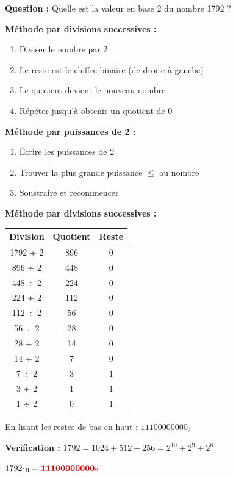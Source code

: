 \documentclass[12pt,a4paper]{article}
\begin{document}
\begin{exercice}
\textbf{Question :} Quelle est la valeur en base 2 du nombre 1792 ?
\end{exercice}

\begin{methode}
\textbf{Méthode par divisions successives :}

\begin{enumerate}
    \item Diviser le nombre par 2
    \item Le reste est le chiffre binaire (de droite à gauche)
    \item Le quotient devient le nouveau nombre
    \item Répéter jusqu'à obtenir un quotient de 0
\end{enumerate}

\textbf{Méthode par puissances de 2 :}
\begin{enumerate}
    \item Écrire les puissances de 2
    \item Trouver la plus grande puissance $\leq$ au nombre
    \item Soustraire et recommencer
\end{enumerate}
\end{methode}

\begin{solution}
\textbf{Méthode par divisions successives :}

\begin{center}
\begin{tabular}{|c|c|c|}
\hline
\textbf{Division} & \textbf{Quotient} & \textbf{Reste} \\
\hline
1792 ÷ 2 & 896 & 0 \\
896 ÷ 2 & 448 & 0 \\
448 ÷ 2 & 224 & 0 \\
224 ÷ 2 & 112 & 0 \\
112 ÷ 2 & 56 & 0 \\
56 ÷ 2 & 28 & 0 \\
28 ÷ 2 & 14 & 0 \\
14 ÷ 2 & 7 & 0 \\
7 ÷ 2 & 3 & 1 \\
3 ÷ 2 & 1 & 1 \\
1 ÷ 2 & 0 & 1 \\
\hline
\end{tabular}
\end{center}

En lisant les restes de bas en haut : $11100000000_2$

\textbf{Verification :} $1792 = 1024 + 512 + 256 = 2^{10} + 2^{9} + 2^{8}$

$1792_{10} = \textcolor{importantrouge}{\textbf{11100000000}_2}$
\end{solution}
\end{document}
